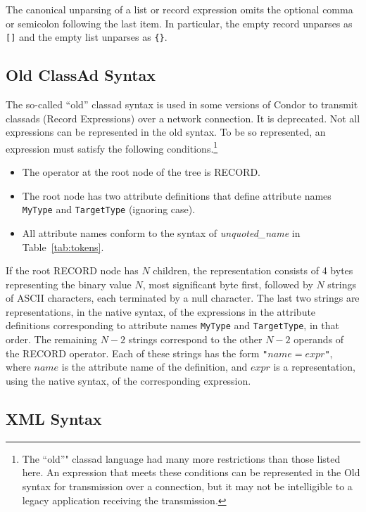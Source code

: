 \documentclass{article}
\begin{document}
The canonical unparsing of a list or record expression omits the optional comma
or semicolon following the last item.  In particular, the empty record
unparses as \verb|[]| and the empty list unparses as \verb|{}|.

\subsection{Old ClassAd Syntax}
\label{sec:old_syntax}

The so-called ``old'' classad syntax is used in some versions of Condor to
transmit classads (Record Expressions) over a network connection.  It is
deprecated.  Not all expressions can be represented in the old syntax.  To be
so represented, an expression must satisfy the following
conditions.\footnote{The ``old''" classad language had many more restrictions
than those listed here.  An expression that meets these conditions can be
represented in the Old syntax for transmission over a connection, but it may
not be intelligible to a legacy application receiving the transmission.}
\begin{itemize}
\item The operator at the root node of the tree is RECORD.
\item The root node has two attribute definitions that define
attribute names \texttt{MyType} and \texttt{TargetType} (ignoring case).
\item All attribute names conform to the syntax of \emph{unquoted\_name} in
Table~\ref{tab:tokens}.
\end{itemize}

If the root RECORD node has $N$ children, the representation consists of 4
bytes representing the binary value $N$, most significant byte first, followed
by $N$ strings of ASCII characters, each terminated by a null character.  The
last two strings are representations, in the native syntax, of the expressions
in the attribute definitions corresponding to attribute names \texttt{MyType}
and \texttt{TargetType}, in that order.  The remaining $N-2$ strings correspond
to the other $N-2$ operands of the RECORD operator.  Each of these strings has
the form \verb/"/$name  =  expr$\verb/"/, where $name$ is the attribute name of
the definition, and $expr$ is a representation, using the native syntax, of the
corresponding expression.

\subsection{XML Syntax}
\label{sec:xml_syntax}
\end{document}
